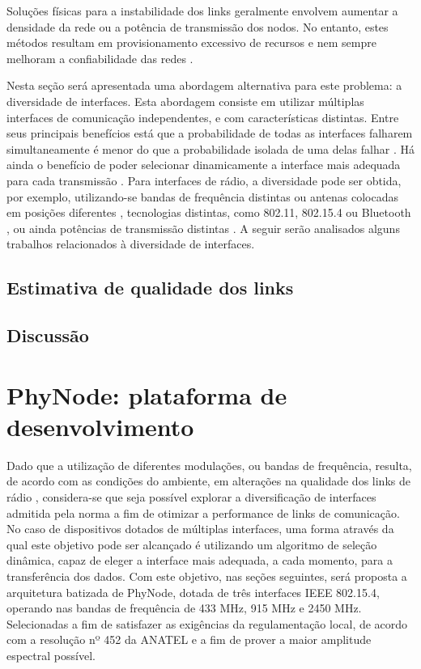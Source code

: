 \documentclass[
	12pt,				%
	openright,			%
	oneside,
	a4paper,			%
	english,			%
	french,				%
	spanish,			%
	brazil				%
	]{abntex2}
\begin{document}
Soluções físicas para a instabilidade dos links geralmente envolvem aumentar a densidade da rede ou a potência de transmissão dos nodos. No entanto, estes métodos resultam em provisionamento excessivo de recursos e nem sempre melhoram a confiabilidade das redes \cite{Kusy2011}.

Nesta seção será apresentada uma abordagem alternativa para este problema: a diversidade de interfaces. Esta abordagem consiste em utilizar múltiplas interfaces de comunicação independentes, e com características distintas. Entre seus principais benefícios está que a probabilidade de todas as interfaces falharem simultaneamente é menor do que a probabilidade isolada de uma delas falhar \cite{Jurdak2011, Kusy2011}. Há ainda o benefício de poder selecionar dinamicamente a interface mais adequada para cada transmissão \cite{Gummeson2010, Lymberopoulos2008, Pering2006}. Para interfaces de rádio, a diversidade pode ser obtida, por exemplo, utilizando-se bandas de frequência distintas ou antenas colocadas em posições diferentes \cite{Jurdak2011, Kusy2011}, tecnologias distintas, como 802.11, 802.15.4 ou Bluetooth \cite{Lymberopoulos2008, Pering2006}, ou ainda potências de transmissão distintas \cite{Gummeson2010}. A seguir serão analisados alguns trabalhos relacionados à diversidade de interfaces.

\section{Estimativa de qualidade dos links}
\section{Discussão}

\chapter{PhyNode: plataforma de desenvolvimento} \label{phynode}

Dado que a utilização de diferentes modulações, ou bandas de frequência, resulta, de acordo com as condições do ambiente, em alterações na qualidade dos links de rádio \cite{bibid}, considera-se que seja possível explorar a diversificação de interfaces admitida pela norma a fim de otimizar a performance de links de comunicação. No caso de dispositivos dotados de múltiplas interfaces, uma forma através da qual este objetivo pode ser alcançado é utilizando um algoritmo de seleção dinâmica, capaz de eleger a interface mais adequada, a cada momento, para a transferência dos dados. Com este objetivo, nas seções seguintes, será proposta a arquitetura batizada de PhyNode, dotada de três interfaces IEEE 802.15.4, operando nas bandas de frequência de 433 MHz, 915 MHz e 2450 MHz. Selecionadas a fim de satisfazer as exigências da regulamentação local, de acordo com a resolução nº 452 da ANATEL \cite{bibid} e a fim de prover a maior amplitude espectral possível.
\end{document}
